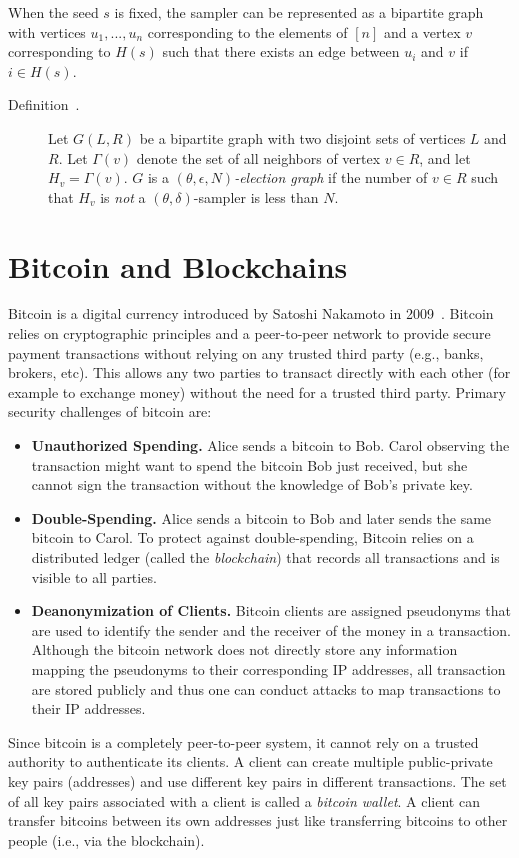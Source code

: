 \documentclass[11pt]{article}
\theoremstyle{plain}
\begin{document}
When the seed $s$ is fixed, the sampler can be represented as a bipartite
graph with vertices $u_{1},...,u_{n}$ corresponding to the elements
of $[n]$ and a vertex $v$ corresponding to $H(s)$ such that there
exists an edge between $u_{i}$ and $v$ if $i\in H(s)$.
\begin{description}
	\item [{Definition~\cite{King:2006:TSS:1170136.1170491}.}] Let $G(L,R)$
	be a bipartite graph with two disjoint sets of vertices $L$ and $R$.
	Let $\Gamma(v)$ denote the set of all neighbors of vertex $v\in R$,
	and let $H_{v}=\Gamma(v)$. $G$ is a \emph{$(\theta,\epsilon,N)$-election
		graph} if the number of $v\in R$ such that $H_{v}$ is \emph{not}
	a $(\theta,\delta)$-sampler is less than $N$.
\end{description}

\section{Bitcoin and Blockchains}

Bitcoin is a digital currency introduced by Satoshi Nakamoto in 2009~\cite{nakamoto08bitcoin}.
Bitcoin relies on cryptographic principles and a peer-to-peer network
to provide secure payment transactions without relying on any trusted
third party (e.g., banks, brokers, etc). This allows any two parties
to transact directly with each other (for example to exchange money)
without the need for a trusted third party. Primary security challenges
of bitcoin are:
\begin{itemize}
	\item \textbf{Unauthorized Spending.} Alice sends a bitcoin to Bob. Carol
	observing the transaction might want to spend the bitcoin Bob just
	received, but she cannot sign the transaction without the knowledge
	of Bob's private key.
	\item \textbf{Double-Spending. }Alice sends a bitcoin to Bob and later sends
	the same bitcoin to Carol. To protect against double-spending, Bitcoin
	relies on a distributed ledger (called the \emph{blockchain}) that
	records all transactions and is visible to all parties.
	\item \textbf{Deanonymization of Clients. }Bitcoin clients are assigned
	pseudonyms\textbf{ }that are used to identify the sender and the receiver
	of the money in a transaction. Although the bitcoin network does not
	directly store any information mapping the pseudonyms to their corresponding
	IP addresses, all transaction are stored publicly and thus one can
	conduct attacks to map transactions to their IP addresses.
\end{itemize}
Since bitcoin is a completely peer-to-peer system, it cannot rely
on a trusted authority to authenticate its clients. A client can create
multiple public-private key pairs (addresses) and use different key
pairs in different transactions. The set of all key pairs associated
with a client is called a \emph{bitcoin wallet}. A client can transfer
bitcoins between its own addresses just like transferring bitcoins
to other people (i.e., via the blockchain).
\end{document}
